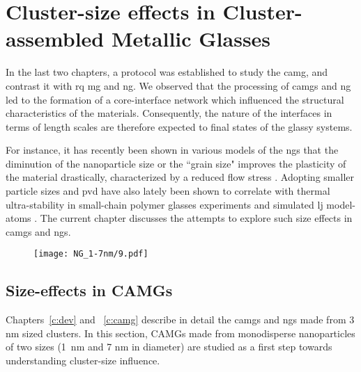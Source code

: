 \chapter{Cluster-size effects in Cluster-assembled Metallic Glasses} \label{c:cbmg}
In the last two chapters, a protocol was established to study the \gls{camg}, and contrast it with \gls{rq} \gls{mg} and \gls{ng}. We observed that the processing of \cz \gls{camg}s and \gls{ng} led to the formation of a core-interface network which influenced the structural characteristics of the materials. Consequently, the nature of the interfaces in terms of length scales are therefore expected to final states of the glassy systems. \par

For instance, it has recently been shown in various models of the \gls{ng}s that the diminution of the nanoparticle size or the ``grain size" improves the plasticity of the material drastically, characterized by a reduced flow stress \cite{Adibi2013,Adibi2014,Cheng2019a}. Adopting smaller particle sizes and \gls{pvd} have also lately been shown to correlate with thermal ultra-stability in small-chain polymer glasses experiments \cite{Raegen2020} and simulated \gls{lj} model-atoms \cite{Singh2013}. The current chapter discusses the attempts to explore such size effects in \gls{camg}s and \gls{ng}s. \par

\begin{figure}[!h] \centering
	\texttt{[image: NG\_1-7nm/9.pdf]}
	\label{f:clussizes}
\end{figure}


\newpage
\section{Size-effects in CAMGs}
Chapters~\ref{c:dev} and ~\ref{c:camg} describe in detail the \gls{camg}s and \gls{ng}s made from 3 nm sized clusters. In this section, CAMGs made from monodisperse nanoparticles of two sizes (\mbox{1 nm} and 7 nm in diameter) are studied as a first step towards understanding cluster-size influence. 

